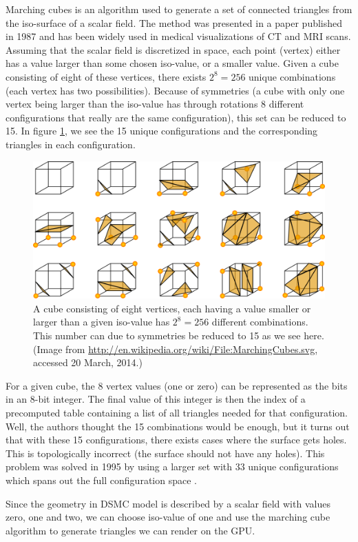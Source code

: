 Marching cubes is an algorithm used to generate a set of connected triangles from the iso-surface of a scalar field. The method was presented in a paper published in 1987 and has been widely used in medical visualizations of CT and MRI scans\cite{wiki:marching_cubes}. Assuming that the scalar field is discretized in space, each point (vertex) either has a value larger than some chosen iso-value, or a smaller value. Given a cube consisting of eight of these vertices, there exists $2^{8}=256$ unique combinations (each vertex has two possibilities). Because of symmetries (a cube with only one vertex being larger than the iso-value has through rotations 8 different configurations that really are the same configuration), this set can be reduced to 15. In figure \ref{fig:vis_marching_cubes}, we see the 15 unique configurations and the corresponding triangles in each configuration.
\begin{figure}[h]
\begin{center}
\includegraphics[width=\textwidth, trim=0cm 0cm 0cm 0cm, clip]{visualization/figures/marching_cubes.png}
\end{center}
\caption{A cube consisting of eight vertices, each having a value smaller or larger than a given iso-value has $2^8=256$ different combinations. This number can due to symmetries be reduced to 15 as we see here. (Image from \url{http://en.wikipedia.org/wiki/File:MarchingCubes.svg}, accessed 20 March, 2014.)}
\label{fig:vis_marching_cubes}
\end{figure}
For a given cube, the 8 vertex values (one or zero) can be represented as the bits in an 8-bit integer. The final value of this integer is then the index of a precomputed table containing a list of all triangles needed for that configuration. Well, the authors thought the 15 combinations would be enough, but it turns out that with these 15 configurations, there exists cases where the surface gets holes. This is topologically incorrect (the surface should not have any holes). This problem was solved in 1995 by using a larger set with 33 unique configurations which spans out the full configuration space \cite{chernyaev1995marching}.

Since the geometry in DSMC model is described by a scalar field with values zero, one and two, we can choose iso-value of one and use the marching cube algorithm to generate triangles we can render on the GPU. 